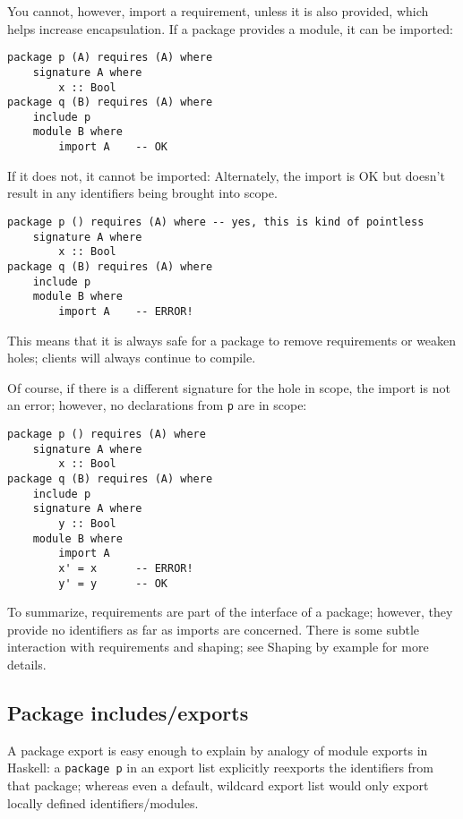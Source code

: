 \documentclass{article}
\newcommand{\Red}[1]{{\color{red} #1}}
\begin{document}
You cannot, however, import a requirement, unless it is also provided,
which helps increase encapsulation.  If a package provides a
module, it can be imported:

\begin{verbatim}
package p (A) requires (A) where
    signature A where
        x :: Bool
package q (B) requires (A) where
    include p
    module B where
        import A    -- OK
\end{verbatim}

If it does not, it cannot be imported:
\Red{Alternately, the import is OK but doesn't result in any identifiers
being brought into scope.}

\begin{verbatim}
package p () requires (A) where -- yes, this is kind of pointless
    signature A where
        x :: Bool
package q (B) requires (A) where
    include p
    module B where
        import A    -- ERROR!
\end{verbatim}

This means that it is always safe for a package to remove requirements
or weaken holes; clients will always continue to compile.

Of course, if there is a different signature for the hole in scope, the
import is not an error; however, no declarations from \verb|p| are in scope:

\begin{verbatim}
package p () requires (A) where
    signature A where
        x :: Bool
package q (B) requires (A) where
    include p
    signature A where
        y :: Bool
    module B where
        import A
        x' = x      -- ERROR!
        y' = y      -- OK
\end{verbatim}

To summarize, requirements are part of the interface of a package; however,
they provide no identifiers as far as imports are concerned.  \Red{There is
some subtle interaction with requirements and shaping; see Shaping by example
for more details.}

\subsection{Package includes/exports}

A package export is easy enough to explain by analogy of module exports
in Haskell: a \verb|package p| in an export list explicitly reexports
the identifiers from that package; whereas even a default, wildcard export
list would only export locally defined identifiers/modules.
\end{document}
